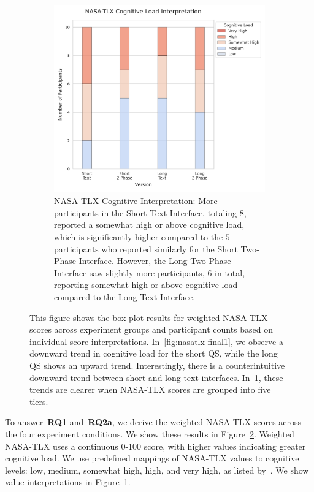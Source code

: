 \begin{figure}[ht]
\begin{subfigure}[b]{0.47\textwidth}
        \includegraphics[width=\textwidth]{content/image/results/nasatlx_cog_value_interpreted.pdf}
        \caption{NASA-TLX Cognitive Interpretation: More participants in the Short Text Interface, totaling $8$, reported a somewhat high or above cognitive load, which is significantly higher compared to the $5$ participants who reported similarly for the Short Two-Phase Interface. However, the Long Two-Phase Interface saw slightly more participants, $6$ in total, reporting somewhat high or above cognitive load compared to the Long Text Interface.\vspace{21pt}}
        \label{fig:nasatlx-final2}
    \end{subfigure}
    \caption{This figure shows the box plot results for weighted NASA-TLX scores across experiment groups and participant counts based on individual score interpretations. In~\ref{fig:nasatlx-final1}, we observe a downward trend in cognitive load for the short QS, while the long QS shows an upward trend. Interestingly, there is a counterintuitive downward trend between short and long text interfaces. In~\ref{fig:nasatlx-final2}, these trends are clearer when NASA-TLX scores are grouped into five tiers.}
    \label{fig:nasatlx-final}
\end{figure}

To answer~\textbf{RQ1} and~\textbf{RQ2a}, we derive the weighted NASA-TLX scores across the four experiment conditions. We show these results in Figure~\ref{fig:nasatlx-final}. Weighted NASA-TLX uses a continuous 0-100 score, with higher values indicating greater cognitive load. We use predefined mappings of NASA-TLX values to cognitive levels: low, medium, somewhat high, high, and very high, as listed by~\textcite{hart1988development}. We show value interpretations in Figure~\ref{fig:nasatlx-final2}. 

